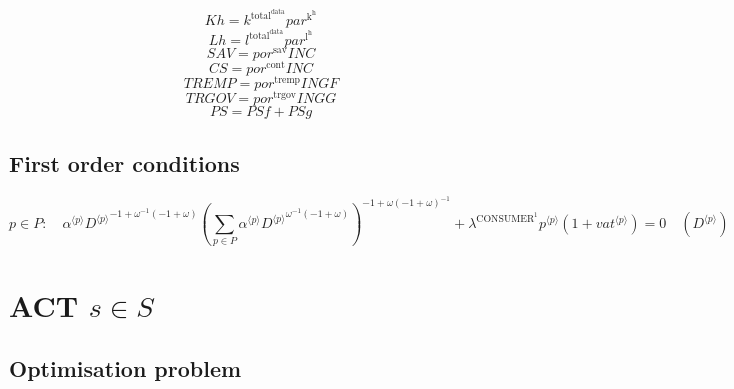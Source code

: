 \begin{equation}
{K\!h} = {k^{\mathrm{total}^{\mathrm{data}}}} {{p\!a\!r}^{\mathrm{k}^{\mathrm{h}}}}
\end{equation}
\begin{equation}
{L\!h} = {l^{\mathrm{total}^{\mathrm{data}}}} {{p\!a\!r}^{\mathrm{l}^{\mathrm{h}}}}
\end{equation}
\begin{equation}
{S\!A\!V} = {{p\!o\!r}^{\mathrm{sav}}} {{I\!N\!C}}
\end{equation}
\begin{equation}
{C\!S} = {{p\!o\!r}^{\mathrm{cont}}} {{I\!N\!C}}
\end{equation}
\begin{equation}
{T\!R\!E\!M\!P} = {{p\!o\!r}^{\mathrm{tremp}}} {{I\!N\!G\!F}}
\end{equation}
\begin{equation}
{T\!R\!G\!O\!V} = {{p\!o\!r}^{\mathrm{trgov}}} {{I\!N\!G\!G}}
\end{equation}
\begin{equation}
{P\!S} = {P\!S\!f} + {P\!S\!g}
\end{equation}


\subsection{First order conditions}

\begin{equation}
p\in P\colon\quad {{\alpha}^{\langle p\rangle}} {{{D}^{\langle p\rangle}}^{-1 + {\omega}^{-1} \left(-1 + \omega\right)}} {\left(\sum_{p\in P} {{\alpha}^{\langle p\rangle}} {{{D}^{\langle p\rangle}}^{{\omega}^{-1} \left(-1 + \omega\right)}}\right)^{-1 + {\omega} \left(-1 + \omega\right)^{-1}}} + {\lambda^{\mathrm{CONSUMER}^{\mathrm{1}}}} {{p}^{\langle p\rangle}} \left(1 + {{v\!a\!t}}^{\langle p\rangle}\right) = 0
 \quad \left({D}^{\langle p\rangle}\right)
\end{equation}




\section{ACT $s\in S$}

\subsection{Optimisation problem}

